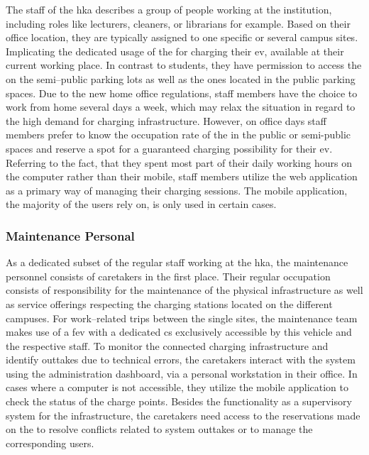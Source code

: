 The staff of the \acrshort{hka} describes a group of people working at the institution, including roles like lecturers, cleaners, or librarians for example.
Based on their office location, they are typically assigned to one specific or several campus sites. Implicating the dedicated usage of the  for charging their \acrshort{ev}, available at their current working place.
In contrast to students, they have permission to access the  on the semi--public parking lots as well as the ones located in the public parking spaces. 
Due to the new home office regulations, staff members have the choice to work from home several days a week, which may relax the situation in regard to the high demand for charging infrastructure.
However, on office days staff members prefer to know the occupation rate of the  in the public or semi-public spaces and reserve a spot for a guaranteed charging possibility for their \acrshort{ev}.
Referring to the fact, that they spent most part of their daily working hours on the computer rather than their mobile, staff members utilize the web application as a primary way of managing their charging sessions.
The mobile application, the majority of the users rely on, is only used in certain cases.

\subsubsection{Maintenance Personal}
\label{ch:Requirements Engineering:sec:Stakeholders:ssec:Staff:sssec:Maintenance Personal}

As a dedicated subset of the regular staff working at the \acrshort{hka}, the maintenance personnel consists of caretakers in the first place. Their regular occupation consists of responsibility for the maintenance of the physical infrastructure as well as service offerings respecting the charging stations located on the different campuses.
For work--related trips between the single sites, the maintenance team makes use of a \acrshort{fev} with a dedicated \acrshort{cs} exclusively accessible by this vehicle and the respective staff.
To monitor the connected charging infrastructure and identify outtakes due to technical errors, the caretakers interact with the system using the administration dashboard, via a personal workstation in their office. In cases where a computer is not accessible, they utilize the mobile application to check the status of the charge points.
Besides the functionality as a supervisory system for the infrastructure, the caretakers need access to the reservations made on the  to resolve conflicts related to system outtakes or to manage the corresponding users.

